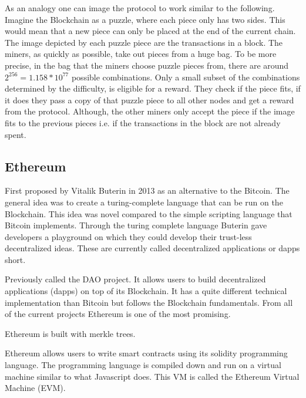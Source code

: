 As an analogy one can image the protocol to work similar to the following. Imagine the Blockchain as a puzzle, where each piece only has two sides. This would mean that a new piece can only be placed at the end of the current chain. The image depicted by each puzzle piece are the transactions in a block. The miners, as quickly as possible, take out pieces from a huge bag. To be more precise, in the bag that the miners choose puzzle pieces from, there are around $2^{256} = 1.158 * 10^{77}$ possible combinations. Only a small subset of the combinations determined by the difficulty, is eligible for a reward. They check if the piece fits, if it does they pass a copy of that puzzle piece to all other nodes and get a reward from the protocol. Although, the other miners only accept the piece if the image fits to the previous pieces i.e. if the transactions in the block are not already spent.

\subsection{Ethereum}
First proposed by Vitalik Buterin in 2013 as an alternative to the Bitcoin. The general idea was to create a turing-complete language that can be run on the Blockchain. This idea was novel compared to the simple scripting language that Bitcoin implements. Through the turing complete language Buterin gave developers a playground on which they could develop their trust-less decentralized ideas. These are currently called decentralized applications or dapps short. 

Previously called the DAO project. It allows users to build decentralized applications (dapps) on top of its Blockchain. It has a quite different technical implementation than Bitcoin but follows the Blockchain fundamentals. From all of the current projects Ethereum is one of the most promising. 

Ethereum is built with merkle trees.

Ethereum allows users to write smart contracts using its solidity programming language. The programming language is compiled down and run on a virtual machine similar to what Javascript does. This VM is called the Ethereum Virtual Machine (EVM). 



